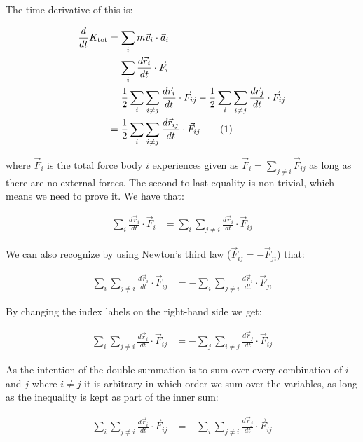 \documentclass[reprint,english,notitlepage]{revtex4-1}  %
\newcommand\numberthis{\addtocounter{equation}{1}\tag{\theequation}}
\begin{document}
The time derivative of this is:

\begin{align*}
\frac{d}{dt} K_\text{tot} &= \sum\limits_i m \vec{v}_i \cdot \vec{a}_i \\
&= \sum\limits_i \frac{d\vec{r}_i}{dt} \cdot \vec{F}_i \\
&= \frac{1}{2}\sum\limits_i \sum\limits_{i\neq j} \frac{d\vec{r}_i}{dt} \cdot \vec{F}_{ij} - \frac{1}{2}\sum\limits_i \sum\limits_{i\neq j} \frac{d\vec{r}_j}{dt} \cdot \vec{F}_{ij} \\
&= \frac{1}{2}\sum\limits_i \sum\limits_{i\neq j} \frac{d\vec{r}_{ij}}{dt} \cdot \vec{F}_{ij} \numberthis \label{eq:kin_en_der1}
\end{align*}


where $\vec{F}_i$ is the total force body $i$ experiences given as $\vec{F}_i = \sum\limits_{j\neq i} \vec{F}_{ij}$ as long as there are no external forces. The second to last equality is non-trivial, which means we need to prove it. We have that:

\begin{align*}
\sum\limits_i \frac{d\vec{r}_i}{dt} \cdot \vec{F}_i &= \sum\limits_i \sum\limits_{j \neq i} \frac{d\vec{r}_i}{dt} \cdot \vec{F}_{ij}
\end{align*}

We can also recognize by using Newton's third law ($\vec{F}_{ij} = - \vec{F}_{ji}$) that:

\begin{align*}
\sum\limits_i \sum\limits_{j \neq i} \frac{d\vec{r}_i}{dt} \cdot \vec{F}_{ij} &= -\sum\limits_i \sum\limits_{j \neq i} \frac{d\vec{r}_i}{dt} \cdot \vec{F}_{ji}
\end{align*}

By changing the index labels on the right-hand side we get:

\begin{align*}
\sum\limits_i \sum\limits_{j \neq i} \frac{d\vec{r}_i}{dt} \cdot \vec{F}_{ij} &= -\sum\limits_j \sum\limits_{i \neq j} \frac{d\vec{r}_j}{dt} \cdot \vec{F}_{ij}
\end{align*}

As the intention of the double summation is to sum over every combination of $i$ and $j$ where $i\neq j$ it is arbitrary in which order we sum over the variables, as long as the inequality is kept as part of the inner sum:

\begin{align*}
\sum\limits_i \sum\limits_{j \neq i} \frac{d\vec{r}_i}{dt} \cdot \vec{F}_{ij} &= -\sum\limits_i \sum\limits_{j \neq i} \frac{d\vec{r}_j}{dt} \cdot \vec{F}_{ij}
\end{align*}
\end{document}
